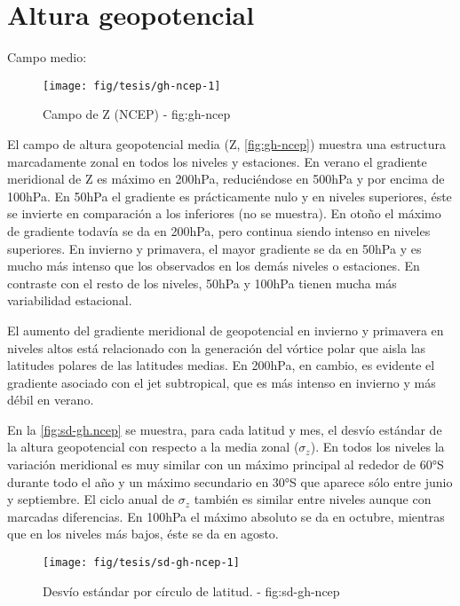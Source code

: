 \documentclass[spanish,a4paper,12p]{book}
\begin{document}
\section{Altura geopotencial}\label{altura-geopotencial}

Campo medio:

\begin{landscape}\begin{figure}

{\centering \texttt{[image: fig/tesis/gh-ncep-1]} 

}

\caption{Campo de Z (NCEP) - fig:gh-ncep}\label{fig:gh-ncep}
\end{figure}
\end{landscape}

El campo de altura geopotencial media (Z, \autoref{fig:gh-ncep}) muestra
una estructura marcadamente zonal en todos los niveles y estaciones. En
verano el gradiente meridional de Z es máximo en 200hPa, reduciéndose en
500hPa y por encima de 100hPa. En 50hPa el gradiente es prácticamente
nulo y en niveles superiores, éste se invierte en comparación a los
inferiores (no se muestra). En otoño el máximo de gradiente todavía se
da en 200hPa, pero continua siendo intenso en niveles superiores. En
invierno y primavera, el mayor gradiente se da en 50hPa y es mucho más
intenso que los observados en los demás niveles o estaciones. En
contraste con el resto de los niveles, 50hPa y 100hPa tienen mucha más
variabilidad estacional.

El aumento del gradiente meridional de geopotencial en invierno y
primavera en niveles altos está relacionado con la generación del
vórtice polar que aisla las latitudes polares de las
latitudes medias. En 200hPa, en cambio, es evidente el gradiente
asociado con el jet subtropical, que es más intenso en invierno y más
débil en verano.

En la \autoref{fig:sd-gh.ncep} se muestra, para cada latitud y mes, el
desvío estándar de la altura geopotencial con respecto a la media zonal
(\(\sigma_z\)). En todos los niveles la variación meridional es muy
similar con un máximo principal al rededor de 60°S durante todo el año y
un máximo secundario en 30°S que aparece sólo entre junio y septiembre.
El ciclo anual de \(\sigma_z\) también es similar entre niveles aunque
con marcadas diferencias. En 100hPa el máximo absoluto se da en octubre,
mientras que en los niveles más bajos, éste se da en agosto.

\begin{figure}

{\centering \texttt{[image: fig/tesis/sd-gh-ncep-1]} 

}

\caption{Desvío estándar por círculo de latitud. - fig:sd-gh-ncep}\label{fig:sd-gh-ncep}
\end{figure}
\end{document}
